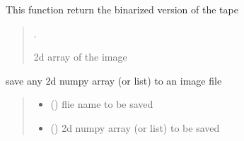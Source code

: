 \documentclass[letterpaper,10pt,english]{sphinxmanual}
\begin{document}

\begin{fulllineitems}
\label{\detokenize{forensicfit.utils.image_tools:forensicfit.utils.image_tools.binerized_mask}}
\pysigstartsignatures
{}
\pysigstopsignatures
\sphinxAtStartPar
This function return the binarized version of the tape
\begin{quote}\begin{description}
\sphinxAtStartPar

\sphinxAtStartPar
.


\sphinxAtStartPar
2d array of the image

\end{description}\end{quote}

\end{fulllineitems}


\begin{fulllineitems}
\label{\detokenize{forensicfit.utils.image_tools:forensicfit.utils.image_tools.imwrite}}
\pysigstartsignatures
{}
\pysigstopsignatures
\sphinxAtStartPar
save any 2d numpy array (or list) to an image file
\begin{quote}\begin{description}
\begin{itemize}
\item {} 
\sphinxAtStartPar
{} () \textendash{} flie name to be saved

\item {} 
\sphinxAtStartPar
{} () \textendash{} 2d numpy array (or list) to be saved

\end{itemize}

\end{description}\end{quote}

\end{fulllineitems}
\end{document}
